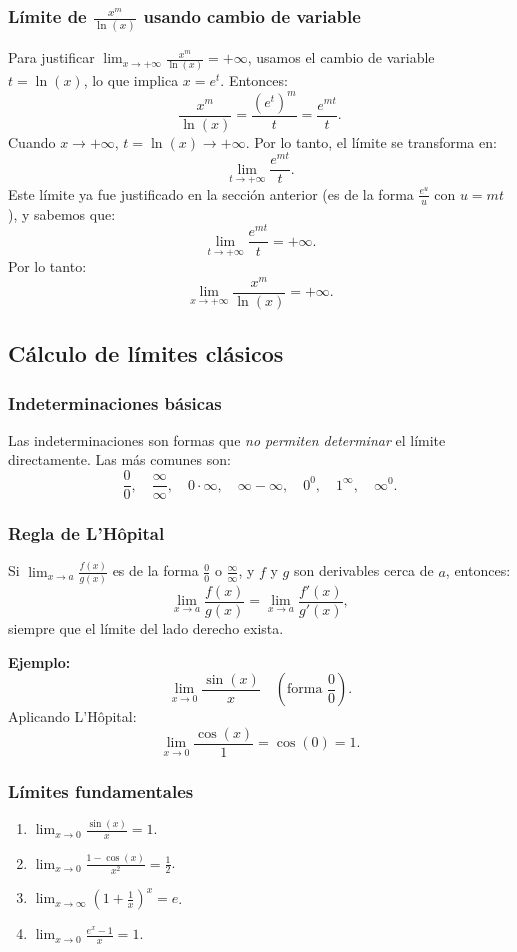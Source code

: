 \documentclass[12pt, a4paper]{article}
\theoremstyle{rioplatense}
\begin{document}
\subsubsection{Límite de \( \frac{x^m}{\ln(x)} \) usando cambio de variable}
Para justificar \(\lim_{x \to +\infty} \frac{x^m}{\ln(x)} = +\infty\), usamos el cambio de variable \( t = \ln(x) \), lo que implica \( x = e^t \). Entonces:
\[
\frac{x^m}{\ln(x)} = \frac{(e^t)^m}{t} = \frac{e^{m t}}{t}.
\]
Cuando \( x \to +\infty \), \( t = \ln(x) \to +\infty \). Por lo tanto, el límite se transforma en:
\[
\lim_{t \to +\infty} \frac{e^{m t}}{t}.
\]
Este límite ya fue justificado en la sección anterior (es de la forma \( \frac{e^u}{u} \) con \( u = m t \)), y sabemos que:
\[
\lim_{t \to +\infty} \frac{e^{m t}}{t} = +\infty.
\]
Por lo tanto:
\[
\lim_{x \to +\infty} \frac{x^m}{\ln(x)} = +\infty.
\]

\subsection{Cálculo de límites clásicos}

\subsubsection{Indeterminaciones básicas}
Las indeterminaciones son formas que \textit{no permiten determinar} el límite directamente. Las más comunes son:
$$
\frac{0}{0}, \quad \frac{\infty}{\infty}, \quad 0 \cdot \infty, \quad \infty - \infty, \quad 0^0, \quad 1^\infty, \quad \infty^0.
$$

\subsubsection{Regla de L'Hôpital}
Si $ \lim_{x \to a} \frac{f(x)}{g(x)} $ es de la forma $ \frac{0}{0} $ o $ \frac{\infty}{\infty} $, y $ f $ y $ g $ son derivables cerca de $ a $, entonces:
$$
\lim_{x \to a} \frac{f(x)}{g(x)} = \lim_{x \to a} \frac{f'(x)}{g'(x)},
$$
siempre que el límite del lado derecho exista.

\textbf{Ejemplo:}
$$
\lim_{x \to 0} \frac{\sin(x)}{x} \quad \left ( \text{forma } \frac{0}{0}\text{}\right).
$$
Aplicando L'Hôpital:
$$
\lim_{x \to 0} \frac{\cos(x)}{1} = \cos(0) = 1.
$$

\subsubsection{Límites fundamentales}
\begin{enumerate}
    \item $\displaystyle \lim_{x \to 0} \frac{\sin(x)}{x} = 1 $.
    \item $\displaystyle \lim_{x \to 0} \frac{1 - \cos(x)}{x^2} = \frac{1}{2} $.
    \item $\displaystyle \lim_{x \to \infty} \left(1 + \frac{1}{x}\right)^x = e $.
    \item $\displaystyle \lim_{x \to 0} \frac{e^x - 1}{x} = 1 $.
\end{enumerate}
\end{document}
